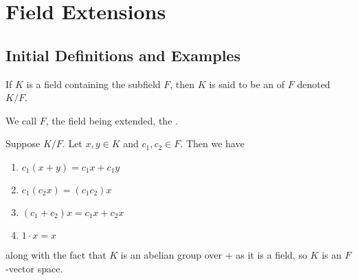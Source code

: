 \chapter{ Field Extensions}
\label{FieldExt}
\section{ Initial Definitions and Examples}

\begin{definition}
    If $K$ is a field containing the subfield $F$, then $K$ is said to be an  of $F$ denoted $K/F$.
        \begin{center}
        \end{center}
    We call $F$, the field being extended, the .
\end{definition}

\begin{remark}
    Suppose $K/F$. Let $x,y \in K$ and $c_1,c_2 \in F$. Then we have \begin{enumerate}
        \item $c_1(x+y) = c_1x+c_1y$
        \item $c_1(c_2x) = (c_1c_2)x$
        \item $(c_1+c_2)x = c_1x+c_2x$
        \item $1\cdot x = x$
    \end{enumerate}
    along with the fact that $K$ is an abelian group over $+$ as it is a field, so $K$ is an $F$-vector space.
\end{remark}

